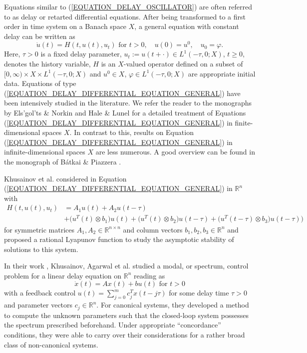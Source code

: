 \documentclass[12pt]{article}
\numberwithin{equation}{section}
\numberwithin{equation}{section}
\begin{document}
Equations similar to (\ref{EQUATION_DELAY_OSCILLATOR}) are often referred to as delay or retarted differential equations.
After being transformed to a first order in time system on a Banach space $X$,
a general equation with constant delay can be written as
\begin{equation}
	\dot{u}(t) = H(t, u(t), u_{t}) \text{ for } t > 0, \quad
	u(0) = u^{0}, \quad u_{0} = \varphi.
	\label{EQUATION_DELAY_DIFFERENTIAL_EQUATION_GENERAL}
\end{equation}
Here, $\tau > 0$ is a fixed delay parameter,
$u_{t} := u(t + \cdot) \in L^{1}(-\tau, 0; X)$, $t \geq 0$, denotes the history variable,
$H$ is an $X$-valued operator defined on a subset of $[0, \infty) \times X \times L^{1}(-\tau, 0; X)$
and $u^{0} \in X$, $\varphi \in L^{1}(-\tau, 0; X)$ are appropriate initial data.
Equations of type (\ref{EQUATION_DELAY_DIFFERENTIAL_EQUATION_GENERAL}) have been intensively studied in the literature.
We refer the reader to the monographs by Els'gol'ts \& Norkin \cite{ElNo1973}
and Hale \& Lunel \cite{HaLu1993}
for a detailed treatment of Equations (\ref{EQUATION_DELAY_DIFFERENTIAL_EQUATION_GENERAL}) in finite-dimensional spaces $X$.
In contrast to this, results on Equation (\ref{EQUATION_DELAY_DIFFERENTIAL_EQUATION_GENERAL}) in infinite-dimensional spaces $X$ are less numerous.
A good overview can be found in the monograph of B\'{a}tkai \& Piazzera \cite{BaPia2005}.

Khusainov et al. considered in \cite{KhuAgDa1999} Equation (\ref{EQUATION_DELAY_DIFFERENTIAL_EQUATION_GENERAL}) in $\mathbb{R}^{n}$ with
\begin{align*}
	H(t, u(t), u_{t}) &= A_{1} u(t) + A_{2} u(t - \tau) \\
	&+ \big(u^{T}(t) \otimes b_{1}\big) u(t) + \big(u^{T}(t) \otimes b_{2}\big) u(t - \tau) + \big(u^{T}(t - \tau) \otimes b_{3}\big) u(t - \tau)\big)
\end{align*}
for symmetric matrices $A_{1}, A_{2} \in \mathbb{R}^{n \times n}$ and column vectors $b_{1}, b_{2}, b_{3} \in \mathbb{R}^{n}$
and proposed a rational Lyapunov function to study the asymptotic stability of solutions to this system.

In their work \cite{KhuAgKosKoj2000}, Khusainov, Agarwal et al. studied a modal, or spectrum, control problem for a linear delay equation on $\mathbb{R}^{n}$ reading as
\begin{equation}
	\dot{x}(t) = A x(t) + b u(t) \text{ for } t > 0
\end{equation}
with a feedback control $u(t) = \sum\limits_{j = 0}^{m} c_{j}^{T} x(t - j \tau)$ for some delay time $\tau > 0$ and parameter vectors $c_{j} \in \mathbb{R}^{n}$.
For canonical systems, they developed a method to compute the unknown parameters
such that the closed-loop system possesses the spectrum prescribed beforehand.
Under appropriate ``concordance'' conditions,
they were able to carry over their considerations for a rather broad class of non-canonical systems.
\end{document}
